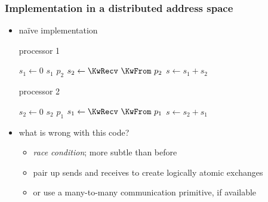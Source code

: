 \begin{frame}[fragile]
%
  \frametitle{Implementation in a distributed address space}
%
  \begin{itemize}
%
  \item na\"ive implementation

    \vspace{.5em}
    \begin{minipage}{.40\linewidth}
      \begin{algorithm}[H]
%
        \footnotesize
        \dontprintsemicolon
        \nocaptionofalgo
        \setalcaphskip{0ex}
%
        \caption{\hspace{1em}processor 1}
        \vspace{.5em}
%
        $s_{1} \leftarrow 0$ \;
        \KwSend $s_{1}$ \KwTo $p_{2}$ \;
        $s_{2} \leftarrow \KwRecv\ \KwFrom\ p_{2}$ \;
        $s \leftarrow s_{1}+s_{2}$ \;
%
        \vspace{.5em}
%
      \end{algorithm}
    \end{minipage}
%
    \hspace{.1\linewidth}
%
    \begin{minipage}{.40\linewidth}
      \begin{algorithm}[H]
%
        \footnotesize
        \dontprintsemicolon
        \nocaptionofalgo
        \setalcaphskip{0ex}
%
        \caption{\hspace{1em}processor 2}
        \vspace{.5em}
%
        $s_{2} \leftarrow 0$ \;
        \KwSend $s_{2}$ \KwTo $p_{1}$ \;
        $s_{1} \leftarrow \KwRecv\ \KwFrom\ p_{1}$ \;
        $s \leftarrow s_{2}+s_{1}$ \;
%
        \vspace{.5em}
      \end{algorithm}
    \end{minipage}
    \vspace{.5em}
%
  \item what is wrong with this code? 
%
    \begin{itemize}
    \item {\em race condition}; more subtle than before
    \item pair up sends and receives to create logically atomic exchanges
    \item or use a many-to-many communication primitive, if available
    \end{itemize}
%
  \end{itemize}
%
\end{frame}

